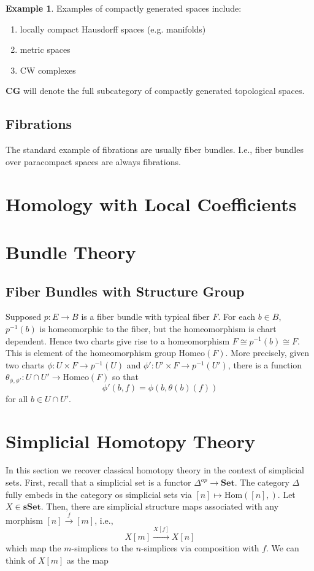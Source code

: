 \documentclass{article}
\theoremstyle{definition}
\newtheorem{ex}{Example}[section]
\newcommand{\cat}{\mathbf}
\newcommand{\Hom}{\text{Hom}}
\begin{document}
    \begin{ex}
    Examples of compactly generated spaces include:
    \begin{enumerate}
    \item locally compact Hausdorff spaces (e.g. manifolds)
    \item metric spaces
    \item CW complexes
    \end{enumerate}
    \end{ex}
 $\cat{CG}$ will denote the full subcategory of compactly generated topological spaces. 
 \subsection{Fibrations}
 The standard example of fibrations are usually fiber bundles. I.e., fiber bundles over paracompact spaces are always fibrations. 
    \section{Homology with Local Coefficients}
    \section{Bundle Theory}
    \subsection{Fiber Bundles with Structure Group}
    Supposed $p:E\rightarrow B$ is a fiber bundle with typical fiber $F$. For each $b\in B$, $p^{-1}(b)$ is homeomorphic to the fiber, but the homeomorphism is chart dependent. Hence two charts give rise to a homeomorphism $F\cong p^{-1}(b)\cong F$. This is element of the homeomorphism group Homeo$(F)$. More precisely, given two charts $\phi:U\times F\rightarrow p^{-1}(U)$ and 
    $\phi':U'\times F\rightarrow p^{-1}(U')$, there is a function $\theta_{\phi,\phi'}:U\cap U'\rightarrow \text{Homeo}(F)$ so that 
    \[\phi'(b,f)=\phi(b,\theta(b)(f))\] for all $b\in U\cap U'.$
    
    \section{Simplicial Homotopy Theory}
    In this section we recover classical homotopy theory in the context of simplicial sets. First, recall that a simplicial set is a functor $\Delta^{op}\rightarrow \cat{Set}$. The category $\Delta$ fully embeds in the category os simplicial sets via $[n]\mapsto \Hom([n], )$. Let $X\in\cat{sSet}$. Then, there are simplicial structure maps associated with any morphism $[n]\xrightarrow{f} [m]$, i.e., 
    \[X[m]\xrightarrow{X[f]} X[n] \] which map the $m$-simplices to the $n$-simplices via composition with $f$. We can think of $X[m]$ as the map
    
\end{document}
